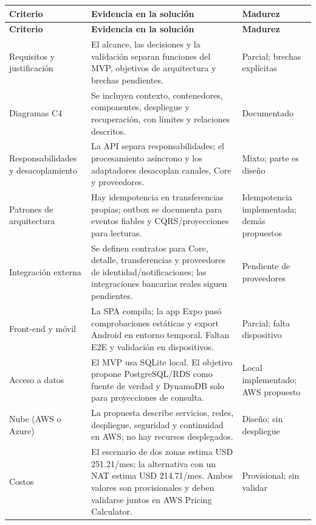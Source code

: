 \documentclass[11pt,a4paper]{report}
\renewcommand{\arraystretch}{1.25}
\begin{document}
\begin{landscape}
\begingroup
\small
\renewcommand{\arraystretch}{1.12}
\begin{longtable}{@{}>{\raggedright\arraybackslash}p{}>{\raggedright\arraybackslash}p{}>{\raggedright\arraybackslash}p{}@{}}
\toprule
\textbf{Criterio} & \textbf{Evidencia en la soluci\'on} & \textbf{Madurez} \\
\midrule
\endfirsthead
\toprule
\textbf{Criterio} & \textbf{Evidencia en la soluci\'on} & \textbf{Madurez} \\
\midrule
\endhead
Requisitos y justificaci\'on & El alcance, las decisiones y la validaci\'on separan funciones del MVP, objetivos de arquitectura y brechas pendientes. & Parcial; brechas expl\'icitas \\
Diagramas C4 & Se incluyen contexto, contenedores, componentes, despliegue y recuperaci\'on, con l\'imites y relaciones descritos. & Documentado \\
Responsabilidades y desacoplamiento & La API separa responsabilidades; el procesamiento as\'incrono y los adaptadores desacoplan canales, Core y proveedores. & Mixto; parte es dise\~no \\
Patrones de arquitectura & Hay idempotencia en transferencias propias; outbox se documenta para eventos fiables y CQRS/proyecciones para lecturas. & Idempotencia implementada; dem\'as propuestos \\
Integraci\'on externa & Se definen contratos para Core, detalle, transferencias y proveedores de identidad/notificaciones; las integraciones bancarias reales siguen pendientes. & Pendiente de proveedores \\
Front-end y m\'ovil & La SPA compila; la app Expo pas\'o comprobaciones est\'aticas y export Android en entorno temporal. Faltan E2E y validaci\'on en dispositivos. & Parcial; falta dispositivo \\
Acceso a datos & El MVP usa SQLite local. El objetivo propone PostgreSQL/RDS como fuente de verdad y DynamoDB solo para proyecciones de consulta. & Local implementado; AWS propuesto \\
Nube (AWS o Azure) & La propuesta describe servicios, redes, despliegue, seguridad y continuidad en AWS; no hay recursos desplegados. & Dise\~no; sin despliegue \\
Costos & El escenario de dos zonas estima USD 251.21/mes; la alternativa con un NAT estima USD 214.71/mes. Ambos valores son provisionales y deben validarse juntos en AWS Pricing Calculator. & Provisional; sin validar \\

\end{longtable}
\end{landscape}
\end{document}
